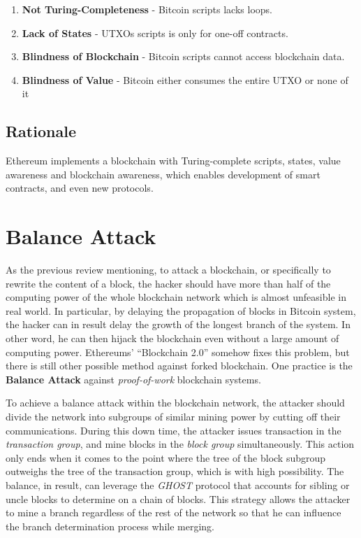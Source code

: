\documentclass[12pt]{article}
\begin{document}
\begin{enumerate}
    \item \textbf{Not Turing-Completeness} - Bitcoin scripts lacks loops.
    \item \textbf{Lack of States} - UTXOs scripts is only for one-off contracts.
    \item \textbf{Blindness of Blockchain} - Bitcoin scripts cannot access blockchain data.
    \item \textbf{Blindness of Value} - Bitcoin either consumes the entire UTXO or none of it
\end{enumerate}

\subsection{Rationale}

Ethereum implements a blockchain with Turing-complete scripts, states, value awareness and blockchain awareness, which enables development of smart contracts, and even new protocols.

\section{Balance Attack}
\label{sec:Balance Attack}

As the previous review mentioning, to attack a blockchain, or specifically to rewrite the content of a block, the hacker should have more than half of the computing power of the whole blockchain network which is almost unfeasible in real world. In particular, by delaying the propagation of blocks in Bitcoin system, the hacker can in result delay the growth of the longest branch of the system. In other word, he can then hijack the blockchain even without a large amount of computing power. Ethereums' ``Blockchain 2.0'' somehow fixes this problem, but there is still other possible method against forked blockchain. One practice is the \textbf{Balance Attack} against \textit{proof-of-work} blockchain systems.

To achieve a balance attack within the blockchain network, the attacker should divide the network into subgroups of similar mining power by cutting off their communications. During this down time, the attacker issues transaction in the \textit{transaction group}, and mine blocks in the \textit{block group} simultaneously. This action only ends when it comes to the point where the tree of the block subgroup outweighs the tree of the transaction group, which is with high possibility. The balance, in result, can leverage the \textit{GHOST} protocol that accounts for sibling or uncle blocks to determine on a chain of blocks. This strategy allows the attacker to mine a branch regardless of the rest of the network so that he can influence the branch determination process while merging.
\end{document}
